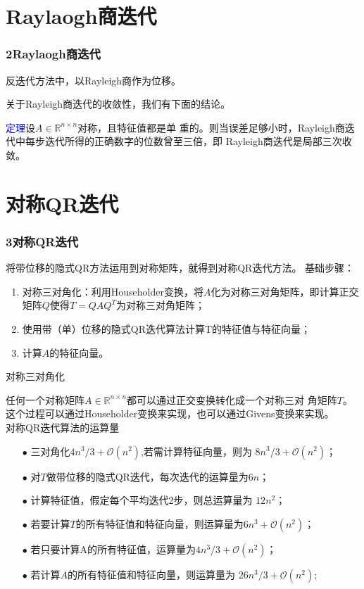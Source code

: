 \documentclass[notheorems,serif]{beamer}
\begin{document}
\section{Raylaogh商迭代}
\begin{frame}
\frametitle{2\qquad Raylaogh商迭代}



反迭代方法中，以Rayleigh商作为位移。

关于Rayleigh商迭代的收敛性，我们有下面的结论。

\textcolor{blue}{定理}\quad 设$A\in \mathbb R^{n\times n}$对称，且特征值都是单
重的。则当误差足够小时，Rayleigh商迭代中每步迭代所得的正确数字的位数曾至三倍，即
Rayleigh商迭代是局部三次收敛。
\end{frame}
\section{对称QR迭代}
\begin{frame}
\frametitle{3\qquad 对称QR迭代}


将带位移的隐式QR方法运用到对称矩阵，就得到对称QR迭代方法。
基础步骤：
\begin{enumerate}[1.]
	\item 对称三对角化：利用Householder变换，将$A$化为对称三对角矩阵，即计算正交
	矩阵$Q$使得$T=QAQ^T$为对称三对角矩阵；
	\item 使用带（单）位移的隐式QR迭代算法计算T的特征值与特征向量；
	\item 计算$A$的特征向量。
\end{enumerate}
\end{frame}
\begin{frame}
对称三对角化

任何一个对称矩阵$A\in \mathbb R^{n\times n}$都可以通过正交变换转化成一个对称三对
角矩阵$T$。这个过程可以通过Householder变换来实现，也可以通过Givens变换来实现。\\
对称QR迭代算法的运算量
\begin{itemize}
	\item[$\bullet$] 三对角化$4n^3/3+\mathcal O(n^2)$,若需计算特征向量，则为
	$8n^3/3+\mathcal O(n^2)$；
	\item[$\bullet$] 对$T$做带位移的隐式QR迭代，每次迭代的运算量为$6n$；
	\item[$\bullet$] 计算特征值，假定每个平均迭代2步，则总运算量为
	$12n^2$；
	\item[$\bullet$] 若要计算$T$的所有特征值和特征向量，则运算量为$6n^3+\mathcal
	O(n^2)$；
	\item[$\bullet$] 若只要计算A的所有特征值，运算量为$4n^3/3+\mathcal O(n^2)$；
	\item[$\bullet$] 若计算$A$的所有特征值和特征向量，则运算量为
	$26n^3/3+\mathcal O(n^2)$;
\end{itemize}
\end{frame}
\end{document}
